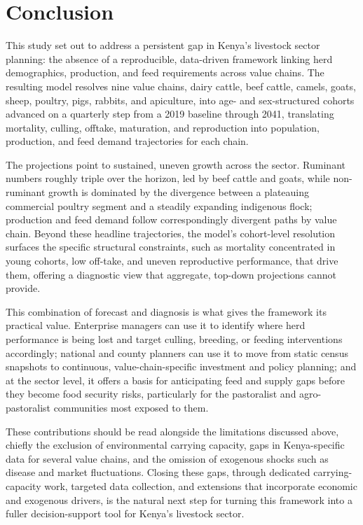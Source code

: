 \section{Conclusion}

This study set out to address a persistent gap in Kenya's livestock sector planning: the absence of a reproducible, data-driven framework linking herd demographics, production, and feed requirements across value chains. The resulting model resolves nine value chains, dairy cattle, beef cattle, camels, goats, sheep, poultry, pigs, rabbits, and apiculture, into age- and sex-structured cohorts advanced on a quarterly step from a 2019 baseline through 2041, translating mortality, culling, offtake, maturation, and reproduction into population, production, and feed demand trajectories for each chain.

The projections point to sustained, uneven growth across the sector. Ruminant numbers roughly triple over the horizon, led by beef cattle and goats, while non-ruminant growth is dominated by the divergence between a plateauing commercial poultry segment and a steadily expanding indigenous flock; production and feed demand follow correspondingly divergent paths by value chain. Beyond these headline trajectories, the model's cohort-level resolution surfaces the specific structural constraints, such as mortality concentrated in young cohorts, low off-take, and uneven reproductive performance, that drive them, offering a diagnostic view that aggregate, top-down projections cannot provide.

This combination of forecast and diagnosis is what gives the framework its practical value. Enterprise managers can use it to identify where herd performance is being lost and target culling, breeding, or feeding interventions accordingly; national and county planners can use it to move from static census snapshots to continuous, value-chain-specific investment and policy planning; and at the sector level, it offers a basis for anticipating feed and supply gaps before they become food security risks, particularly for the pastoralist and agro-pastoralist communities most exposed to them.

These contributions should be read alongside the limitations discussed above, chiefly the exclusion of environmental carrying capacity, gaps in Kenya-specific data for several value chains, and the omission of exogenous shocks such as disease and market fluctuations. Closing these gaps, through dedicated carrying-capacity work, targeted data collection, and extensions that incorporate economic and exogenous drivers, is the natural next step for turning this framework into a fuller decision-support tool for Kenya's livestock sector.
